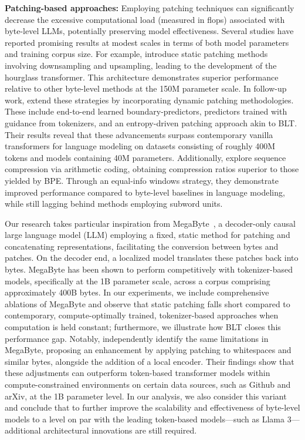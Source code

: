 \textbf{Patching-based approaches:} Employing patching techniques can significantly decrease the excessive computational load (measured in flops) associated with byte-level LLMs, potentially preserving model effectiveness. Several studies have reported promising results at modest scales in terms of both model parameters and training corpus size. For example, \cite{nawrot-etal-2022-hierarchical} introduce static patching methods involving downsampling and upsampling, leading to the development of the hourglass transformer. This architecture demonstrates superior performance relative to other byte-level methods at the 150M parameter scale. In follow-up work, \cite{nawrot-etal-2023-efficient} extend these strategies by incorporating dynamic patching methodologies. These include end-to-end learned boundary-predictors, predictors trained with guidance from tokenizers, and an entropy-driven patching approach akin to {\textsc BLT}. Their results reveal that these advancements surpass contemporary vanilla transformers for language modeling on datasets consisting of roughly 400M tokens and models containing 40M parameters. Additionally, \cite{lester2024training} explore sequence compression via arithmetic coding, obtaining compression ratios superior to those yielded by BPE. Through an equal-info windows strategy, they demonstrate improved performance compared to byte-level baselines in language modeling, while still lagging behind methods employing subword units.

Our research takes particular inspiration from MegaByte~\citep{yu2023megabyte}, a decoder-only causal large language model (LLM) employing a fixed, static method for patching and concatenating representations, facilitating the conversion between bytes and patches. On the decoder end, a localized model translates these patches back into bytes. MegaByte has been shown to perform competitively with tokenizer-based models, specifically at the 1B parameter scale, across a corpus comprising approximately 400B bytes. In our experiments, we include comprehensive ablations of MegaByte and observe that static patching falls short compared to contemporary, compute-optimally trained, tokenizer-based approaches when computation is held constant; furthermore, we illustrate how {\textsc BLT} closes this performance gap. Notably, \cite{slagle2024spacebyte} independently identify the same limitations in MegaByte, proposing an enhancement by applying patching to whitespaces and similar bytes, alongside the addition of a local encoder. Their findings show that these adjustments can outperform token-based transformer models within compute-constrained environments on certain data sources, such as Github and arXiv, at the 1B parameter level. In our analysis, we also consider this variant and conclude that to further improve the scalability and effectiveness of byte-level models to a level on par with the leading token-based models—such as Llama 3—additional architectural innovations are still required.

